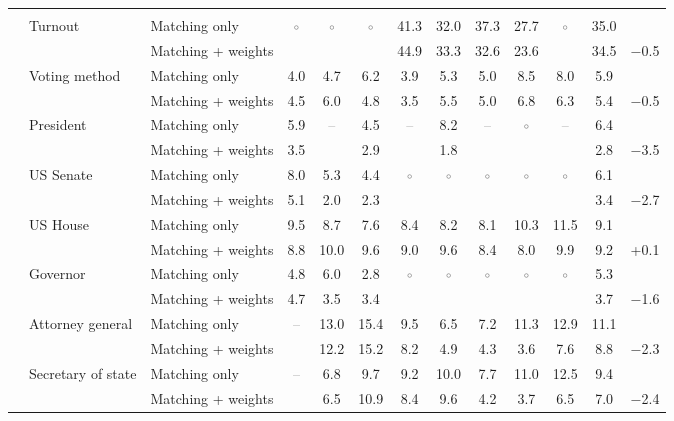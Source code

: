 \begin{table}[!htbp]
{\begin{threeparttable}
\begin{tabular}{llcccccccccc}
\addlinespace[0.3em]
\multicolumn{12}{l}{Non-demographic} \\
\addlinespace[0.1em]
~~Turnout & Matching only & \textcolor{gray}{$\circ$} & \textcolor{gray}{$\circ$} & \textcolor{gray}{$\circ$} & 41.3 & 32.0 & 37.3 & 27.7 & \textcolor{gray}{$\circ$} & 35.0 & \\
 & Matching + weights &  &  &  & 44.9 & 33.3 & 32.6 & 23.6 &  & 34.5 & $-$0.5 \\
\addlinespace[0.1em]
~~Voting method & Matching only & 4.0 & 4.7 & 6.2 & 3.9 & 5.3 & 5.0 & 8.5 & 8.0 & 5.9 & \\
 & Matching + weights & 4.5 & 6.0 & 4.8 & 3.5 & 5.5 & 5.0 & 6.8 & 6.3 & 5.4 & $-$0.5 \\
\addlinespace[0.1em]
~~President & Matching only & 5.9 & \textcolor{gray}{--} & 4.5 & \textcolor{gray}{--} & 8.2 & \textcolor{gray}{--} & \textcolor{gray}{$\circ$} & \textcolor{gray}{--} & 6.4 & \\
 & Matching + weights & 3.5 &  & 2.9 &  & 1.8 &  &  &  & 2.8 & $-$3.5 \\
\addlinespace[0.1em]
~~US Senate & Matching only & 8.0 & 5.3 & 4.4 & \textcolor{gray}{$\circ$} & \textcolor{gray}{$\circ$} & \textcolor{gray}{$\circ$} & \textcolor{gray}{$\circ$} & \textcolor{gray}{$\circ$} & 6.1 & \\
 & Matching + weights & 5.1 & 2.0 & 2.3 &  &  &  &  &  & 3.4 & $-$2.7 \\
\addlinespace[0.1em]
~~US House & Matching only & 9.5 & 8.7 & 7.6 & 8.4 & 8.2 & 8.1 & 10.3 & 11.5 & 9.1 & \\
 & Matching + weights & 8.8 & 10.0 & 9.6 & 9.0 & 9.6 & 8.4 & 8.0 & 9.9 & 9.2 & +0.1 \\
\addlinespace[0.1em]
~~Governor & Matching only & 4.8 & 6.0 & 2.8 & \textcolor{gray}{$\circ$} & \textcolor{gray}{$\circ$} & \textcolor{gray}{$\circ$} & \textcolor{gray}{$\circ$} & \textcolor{gray}{$\circ$} & 5.3 & \\
 & Matching + weights & 4.7 & 3.5 & 3.4 &  &  &  &  &  & 3.7 & $-$1.6 \\
\addlinespace[0.1em]
~~Attorney general & Matching only & \textcolor{gray}{--} & 13.0 & 15.4 & 9.5 & 6.5 & 7.2 & 11.3 & 12.9 & 11.1 & \\
 & Matching + weights &  & 12.2 & 15.2 & 8.2 & 4.9 & 4.3 & 3.6 & 7.6 & 8.8 & $-$2.3 \\
\addlinespace[0.1em]
~~Secretary of state & Matching only & \textcolor{gray}{--} & 6.8 & 9.7 & 9.2 & 10.0 & 7.7 & 11.0 & 12.5 & 9.4 & \\
 & Matching + weights &  & 6.5 & 10.9 & 8.4 & 9.6 & 4.2 & 3.7 & 6.5 & 7.0 & $-$2.4 \\

\end{tabular}
\end{threeparttable}}
\end{table}

